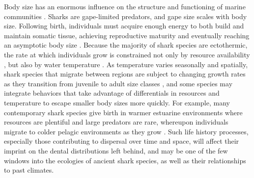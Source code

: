 \documentclass[]{rsos}%
\begin{document}

Body size has an enormous influence on the structure and functioning of marine communities \cite{brose2006consumer}. 
Sharks are gape-limited predators, and gape size scales with body size.
Following birth, individuals must acquire enough energy to both build and maintain somatic tissue, achieving reproductive maturity and eventually reaching an asymptotic body size \cite{West:2001bv}.
Because the majority of shark species are ectothermic, the rate at which individuals grow is constrained not only by resource availability \cite{bhat2020scaling}, but also by water temperature \cite{schindler2002sharks}. 
As temperature varies seasonally and spatially, shark species that migrate between regions are subject to changing growth rates as they transition from juvenile to adult size classes \cite{heithaus2007nursery,doan2020adult}, and some species may integrate behaviors that take advantage of differentials in resources and temperature to escape smaller body sizes more quickly.
For example, many contemporary shark species give birth in warmer estuarine environments where resources are plentiful and large predators are rare, whereupon individuals migrate to colder pelagic environments as they grow \cite{heupel2007shark}.
Such life history processes, especially those contributing to dispersal over time and space, will affect their imprint on the dental distributions left behind, and may be one of the few windows into the ecologies of ancient shark species, as well as their relationships to past climates.
\end{document}
